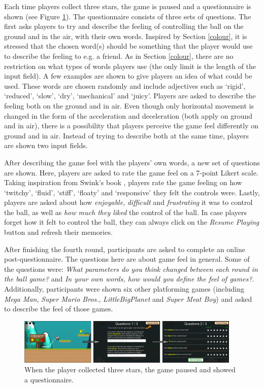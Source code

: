 Each time players collect three stars, the game is paused and a questionnaire is shown (see Figure \ref{fig:questionnaire}). The questionnaire consists of three sets of questions. The first asks players to try and describe the feeling of controlling the ball on the ground and in the air, with their own words. Inspired by Section \ref{colour}, it is stressed that the chosen word(s) should be something that the player would use to describe the feeling to e.g. a friend. As in Section \ref{colour}, there are no restriction on what types of words players use (the only limit is the length of the input field). A few examples are shown to give players an idea of what could be used. These words are chosen randomly and include adjectives such as `rigid', `reduced', `slow', `dry', `mechanical' and `juicy'. Players are asked to describe the feeling both on the ground and in air. Even though only horizontal movement is changed in the form of the acceleration and deceleration (both apply on ground and in air), there is a possibility that players perceive the game feel differently on ground and in air. Instead of trying to describe both at the same time, players are shown two input fields.

After describing the game feel with the players' own words, a new set of questions are shown. Here, players are asked to rate the game feel on a 7-point Likert scale. Taking inspiration from Swink's book \cite{swink}, players rate the game feeling on how `twitchy', `fluid', `stiff', `floaty' and `responsive' they felt the controls were. Lastly, players are asked about how \textit{enjoyable}, \textit{difficult} and \textit{frustrating} it was to control the ball, as well as \textit{how much they liked} the control of the ball. In case players forget how it felt to control the ball, they can always click on the \textit{Resume Playing} button and refresh their memories.

After finishing the fourth round, participants are asked to complete an online post-questionnaire. The questions here are about game feel in general. Some of the questions were: \textit{What parameters do you think changed between each round in the ball game?} and \textit{In your own words, how would you define the feel of games?}. Additionally, participants were shown six other platforming games (including \textit{Mega Man}, \textit{Super Mario Bros.}, \textit{LittleBigPlanet} and \textit{Super Meat Boy}) and asked to describe the feel of those games.

\begin{figure}[htbp]
\centering
\includegraphics[width=0.95\textwidth]{Pics/game_phases}
\caption{When the player collected three stars, the game paused and showed a questionnaire.}
\label{fig:questionnaire}
\end{figure}

